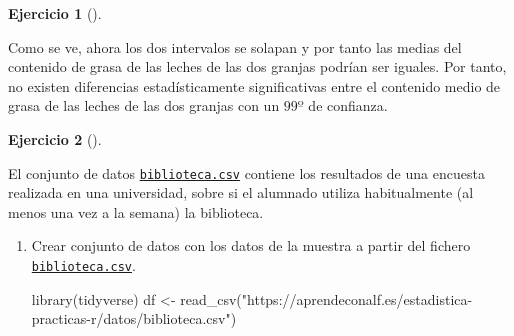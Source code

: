 \documentclass[
  a4paper,
]{scrreport}
\newenvironment{Shaded}{\begin{snugshade}}{\end{snugshade}}
\newcommand{\FunctionTok}[1]{\textcolor[rgb]{0.28,0.35,0.67}{#1}}
\newcommand{\NormalTok}[1]{\textcolor[rgb]{0.00,0.23,0.31}{#1}}
\newcommand{\OtherTok}[1]{\textcolor[rgb]{0.00,0.23,0.31}{#1}}
\newcommand{\StringTok}[1]{\textcolor[rgb]{0.13,0.47,0.30}{#1}}
\theoremstyle{definition}
\newtheorem{exercise}{Ejercicio}[chapter]
\theoremstyle{remark}
\begin{document}
\begin{exercise}[]
\begin{enumerate}
\begin{tcolorbox}
\begin{figure}[H]
{  }

  \end{figure}

  Como se ve, ahora los dos intervalos se solapan y por tanto las medias
  del contenido de grasa de las leches de las dos granjas podrían ser
  iguales. Por tanto, no existen diferencias estadísticamente
  significativas entre el contenido medio de grasa de las leches de las
  dos granjas con un \(99º%
  \) de confianza.

  \end{tcolorbox}
\end{enumerate}

\end{exercise}

\begin{exercise}[]\protect\hypertarget{exr-uso-biblioteca}{}\label{exr-uso-biblioteca}

El conjunto de datos
\href{https://aprendeconalf.es/estadistica-practicas-r/datos/biblioteca.csv}{\texttt{biblioteca.csv}}
contiene los resultados de una encuesta realizada en una universidad,
sobre si el alumnado utiliza habitualmente (al menos una vez a la
semana) la biblioteca.

\begin{enumerate}
\def\labelenumi{\alph{enumi}.}
\item
  Crear conjunto de datos con los datos de la muestra a partir del
  fichero
  \href{https://aprendeconalf.es/estadistica-practicas-r/datos/biblioteca.csv}{\texttt{biblioteca.csv}}.

  \begin{tcolorbox}[enhanced jigsaw, coltitle=black, left=2mm, colback=white, leftrule=.75mm, toptitle=1mm, breakable, bottomrule=.15mm, titlerule=0mm, bottomtitle=1mm, title=\textcolor{quarto-callout-tip-color}{\faLightbulb}\hspace{0.5em}{Solución}, arc=.35mm, toprule=.15mm, rightrule=.15mm, colframe=quarto-callout-tip-color-frame, opacityback=0, colbacktitle=quarto-callout-tip-color!10!white, opacitybacktitle=0.6]

\begin{Shaded}
\begin{Highlighting}[]
\FunctionTok{library}\NormalTok{(tidyverse)}
\NormalTok{df }\OtherTok{\textless{}{-}} \FunctionTok{read\_csv}\NormalTok{(}\StringTok{"https://aprendeconalf.es/estadistica{-}practicas{-}r/datos/biblioteca.csv"}\NormalTok{)}
\end{Highlighting}
\end{Shaded}


\end{tcolorbox}
\end{enumerate}
\end{exercise}
\end{document}
